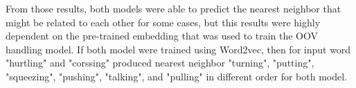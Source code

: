         From those results, both models were able to predict the
        nearest neighbor that might be related to each other for some
        cases, but this results were highly dependent on the pre-trained
        embedding that was used to train the OOV handling model. If both model
        were trained using Word2vec, then for input word "hurtling"
        and "corssing" produced nearest neighbor "turning", "putting",
        "squeezing", "pushing", "talking", and "pulling" in different
        order for both model.
        


        

